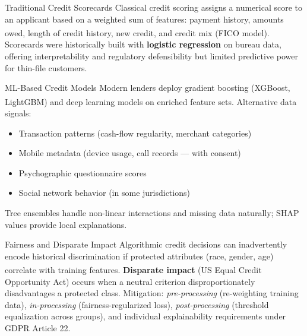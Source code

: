 \begin{v3topic}{Traditional Credit Scorecards}
    Classical credit scoring assigns a numerical score to an applicant based on a weighted sum of features: payment history, amounts owed, length of credit history, new credit, and credit mix (FICO model)\textsuperscript{\cite[][p.~149]{jansenMachineLearningAlgorithmic2020}}.
    Scorecards were historically built with \textbf{logistic regression} on bureau data, offering interpretability and regulatory defensibility but limited predictive power for thin-file customers.

\end{v3topic}
\begin{v3topic}{ML-Based Credit Models}
    Modern lenders deploy gradient boosting (XGBoost, LightGBM) and deep learning models on enriched feature sets\textsuperscript{\cite[][pp.~365--366]{jansenMachineLearningAlgorithmic2020}}.
    Alternative data signals:
\visualseparator
    \begin{itemize}
        \item Transaction patterns (cash-flow regularity, merchant categories)
        \item Mobile metadata (device usage, call records — with consent)
        \item Psychographic questionnaire scores
        \item Social network behavior (in some jurisdictions)
    \end{itemize}
    Tree ensembles handle non-linear interactions and missing data naturally; SHAP values provide local explanations.

\end{v3topic}
\begin{v3topic}{Fairness and Disparate Impact}
    Algorithmic credit decisions can inadvertently encode historical discrimination if protected attributes (race, gender, age) correlate with training features\textsuperscript{\cite[][p.~716]{jansenMachineLearningAlgorithmic2020}}.
    \textbf{Disparate impact} (US Equal Credit Opportunity Act) occurs when a neutral criterion disproportionately disadvantages a protected class.
    Mitigation: \emph{pre-processing} (re-weighting training data), \emph{in-processing} (fairness-regularized loss), \emph{post-processing} (threshold equalization across groups), and individual explainability requirements under GDPR Article 22.

\end{v3topic}

